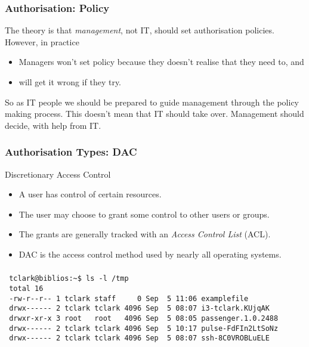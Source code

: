 \documentclass[10pt]{beamer}
\begin{document}
\begin{frame}
  \frametitle{Authorisation: Policy}

 The theory is that \emph{management}, not IT, should set authorisation policies.  However, in 
 practice
 \begin{itemize}
  \item Managers won't set policy because they doesn't realise that they need to, and
  \item will get it wrong if they try.
  \end{itemize}

  So as IT people we should be prepared to guide management through the policy making process.
  This doesn't mean that IT should take over.  Management should decide, with help from IT.
\end{frame}



\begin{frame}
  \frametitle{Authorisation Types: DAC}

  Discretionary Access Control

  \begin{itemize}
  \item A user has control of certain resources.
  \item The user may choose to grant some control to other users or groups.
  \item The grants are generally tracked with an \emph{Access Control List} (ACL).
  \item DAC is the access control method used by nearly all operating systems.
  \end{itemize}
\end{frame}



\begin{frame}[fragile]
  \frametitle{}

 \begin{verbatim}
 tclark@biblios:~$ ls -l /tmp
 total 16
 -rw-r--r-- 1 tclark staff     0 Sep  5 11:06 examplefile
 drwx------ 2 tclark tclark 4096 Sep  5 08:07 i3-tclark.KUjqAK
 drwxr-xr-x 3 root   root   4096 Sep  5 08:05 passenger.1.0.2488
 drwx------ 2 tclark tclark 4096 Sep  5 10:17 pulse-FdFIn2LtSoNz
 drwx------ 2 tclark tclark 4096 Sep  5 08:07 ssh-8C0VROBLuELE

  \end{verbatim}
\end{frame}
\end{document}
